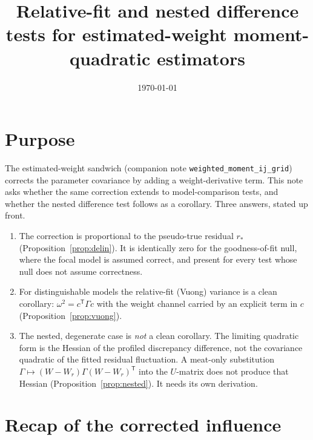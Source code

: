 \documentclass[11pt]{article}
\title{Relative-fit and nested difference tests for estimated-weight
  moment-quadratic estimators}
\author{}
\date{\today}
\newcommand{\T}{^{\mathsf{T}}}
\newcommand{\Wr}{W_{\!r}}
\newcommand{\rs}{r_{*}}
\theoremstyle{plain}
\theoremstyle{remark}
\begin{document}
\maketitle

\section*{Purpose}

The estimated-weight sandwich (companion note
\texttt{weighted\_moment\_ij\_grid}) corrects the parameter covariance by
adding a weight-derivative term. This note asks whether the same correction
extends to model-comparison tests, and whether the nested difference test
follows as a corollary. Three answers, stated up front.

\begin{enumerate}
\item The correction is proportional to the pseudo-true residual $\rs$
  (Proposition~\ref{prop:delin}). It is identically zero for the
  goodness-of-fit null, where the focal model is assumed correct, and present
  for every test whose null does not assume correctness.
\item For distinguishable models the relative-fit (Vuong) variance is a clean
  corollary: $\omega^{2}=c\T\Gamma c$ with the weight channel carried by an
  explicit term in $c$ (Proposition~\ref{prop:vuong}).
\item The nested, degenerate case is \emph{not} a clean corollary. The limiting
  quadratic form is the Hessian of the profiled discrepancy difference, not the
  covariance quadratic of the fitted residual fluctuation. A meat-only
  substitution $\Gamma\mapsto(W-\Wr)\Gamma(W-\Wr)\T$ into the $U$-matrix does
  not produce that Hessian (Proposition~\ref{prop:nested}). It needs its own
  derivation.
\end{enumerate}

\section{Recap of the corrected influence}
\label{sec:recap}
\end{document}
